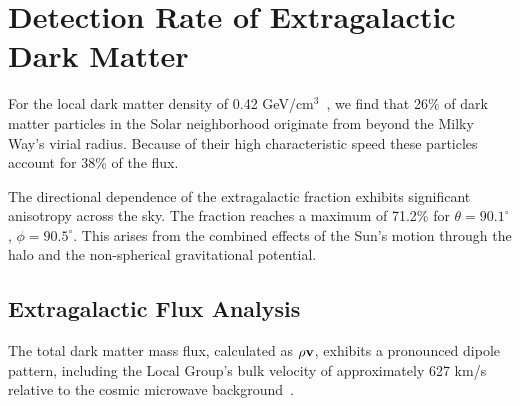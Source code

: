 \documentclass[%
 reprint,
 amsmath,amssymb,
 aps,
]{revtex4-2}
\begin{document}
\section{Detection Rate of Extragalactic Dark Matter}
\label{sec:extragalactic}



For the local dark matter density of 0.42 GeV/cm$^3$~\cite{Read2014,Piffl2014,Bovy2013}, we find that 26\% of dark matter particles in the Solar neighborhood originate from beyond the Milky Way's virial radius. Because of their high characteristic speed these particles account for 38\% of the flux.

The directional dependence of the extragalactic fraction exhibits significant anisotropy across the sky. The fraction reaches a maximum of 71.2\% for $\theta=90.1^{\circ}$, $\phi=90.5^{\circ}$. This arises from the combined effects of the Sun's motion through the halo and the non-spherical gravitational potential. 




\subsection{Extragalactic Flux Analysis}
\label{subsec:massflux}
The total dark matter mass flux, calculated as $\rho {\bf v}$, exhibits a pronounced dipole pattern, including the Local Group's bulk velocity of approximately 627 km/s relative to the cosmic microwave background~\cite{Rubin2014}.
\end{document}
